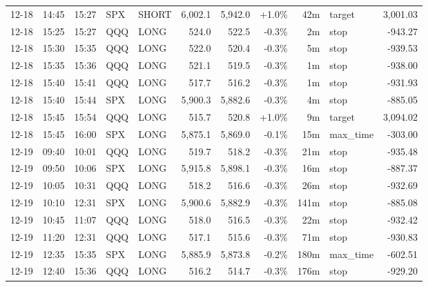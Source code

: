 \documentclass[11pt,a4paper,twoside]{article}
\begin{document}
\begin{center}
\begin{longtable}{>{\color{txtmain}}l l l l l r r r r >{\color{txtmain}}l r}
12-18 & 14:45 & 15:27 & SPX & SHORT & 6,002.1 & 5,942.0 & \textcolor{wingreen}{+1.0\%} & 42m & target & \textcolor{wingreen}{3,001.03} \\
12-18 & 15:25 & 15:27 & QQQ & LONG & 524.0 & 522.5 & \textcolor{lossred}{-0.3\%} & 2m & stop & \textcolor{lossred}{-943.27} \\
12-18 & 15:30 & 15:35 & QQQ & LONG & 522.0 & 520.4 & \textcolor{lossred}{-0.3\%} & 5m & stop & \textcolor{lossred}{-939.53} \\
12-18 & 15:35 & 15:36 & QQQ & LONG & 521.1 & 519.5 & \textcolor{lossred}{-0.3\%} & 1m & stop & \textcolor{lossred}{-938.00} \\
12-18 & 15:40 & 15:41 & QQQ & LONG & 517.7 & 516.2 & \textcolor{lossred}{-0.3\%} & 1m & stop & \textcolor{lossred}{-931.93} \\
12-18 & 15:40 & 15:44 & SPX & LONG & 5,900.3 & 5,882.6 & \textcolor{lossred}{-0.3\%} & 4m & stop & \textcolor{lossred}{-885.05} \\
12-18 & 15:45 & 15:54 & QQQ & LONG & 515.7 & 520.8 & \textcolor{wingreen}{+1.0\%} & 9m & target & \textcolor{wingreen}{3,094.02} \\
12-18 & 15:45 & 16:00 & SPX & LONG & 5,875.1 & 5,869.0 & \textcolor{lossred}{-0.1\%} & 15m & max\_time & \textcolor{lossred}{-303.00} \\
12-19 & 09:40 & 10:01 & QQQ & LONG & 519.7 & 518.2 & \textcolor{lossred}{-0.3\%} & 21m & stop & \textcolor{lossred}{-935.48} \\
12-19 & 09:50 & 10:06 & SPX & LONG & 5,915.8 & 5,898.1 & \textcolor{lossred}{-0.3\%} & 16m & stop & \textcolor{lossred}{-887.37} \\
12-19 & 10:05 & 10:31 & QQQ & LONG & 518.2 & 516.6 & \textcolor{lossred}{-0.3\%} & 26m & stop & \textcolor{lossred}{-932.69} \\
12-19 & 10:10 & 12:31 & SPX & LONG & 5,900.6 & 5,882.9 & \textcolor{lossred}{-0.3\%} & 141m & stop & \textcolor{lossred}{-885.08} \\
12-19 & 10:45 & 11:07 & QQQ & LONG & 518.0 & 516.5 & \textcolor{lossred}{-0.3\%} & 22m & stop & \textcolor{lossred}{-932.42} \\
12-19 & 11:20 & 12:31 & QQQ & LONG & 517.1 & 515.6 & \textcolor{lossred}{-0.3\%} & 71m & stop & \textcolor{lossred}{-930.83} \\
12-19 & 12:35 & 15:35 & SPX & LONG & 5,885.9 & 5,873.8 & \textcolor{lossred}{-0.2\%} & 180m & max\_time & \textcolor{lossred}{-602.51} \\
12-19 & 12:40 & 15:36 & QQQ & LONG & 516.2 & 514.7 & \textcolor{lossred}{-0.3\%} & 176m & stop & \textcolor{lossred}{-929.20} \\

\end{longtable}
\end{center}
\end{document}
